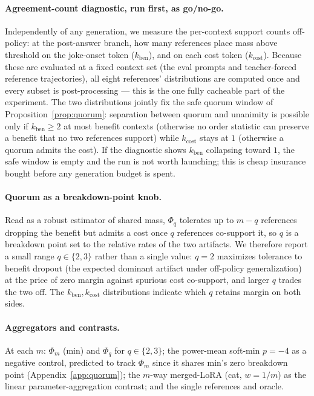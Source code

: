 \documentclass[11pt]{article}
\begin{document}
\paragraph{Agreement-count diagnostic, run first, as go/no-go.} Independently of any generation, we measure the per-context support counts off-policy: at the post-answer branch, how many references place mass above threshold on the joke-onset token ($k_{\mathrm{ben}}$), and on each cost token ($k_{\mathrm{cost}}$). Because these are evaluated at a fixed context set (the eval prompts and teacher-forced reference trajectories), all eight references' distributions are computed once and every subset is post-processing --- this is the one fully cacheable part of the experiment. The two distributions jointly fix the safe quorum window of Proposition~\ref{prop:quorum}: separation between quorum and unanimity is possible only if $k_{\mathrm{ben}} \ge 2$ at most benefit contexts (otherwise no order statistic can preserve a benefit that no two references support) while $k_{\mathrm{cost}}$ stays at $1$ (otherwise a quorum admits the cost). If the diagnostic shows $k_{\mathrm{ben}}$ collapsing toward $1$, the safe window is empty and the run is not worth launching; this is cheap insurance bought before any generation budget is spent.

\paragraph{Quorum as a breakdown-point knob.} Read as a robust estimator of shared mass, $\Phi_q$ tolerates up to $m - q$ references dropping the benefit but admits a cost once $q$ references co-support it, so $q$ is a breakdown point set to the relative rates of the two artifacts. We therefore report a small range $q \in \{2, 3\}$ rather than a single value: $q = 2$ maximizes tolerance to benefit dropout (the expected dominant artifact under off-policy generalization) at the price of zero margin against spurious cost co-support, and larger $q$ trades the two off. The $k_{\mathrm{ben}}, k_{\mathrm{cost}}$ distributions indicate which $q$ retains margin on both sides.

\paragraph{Aggregators and contrasts.} At each $m$: $\Phi_m$ (min) and $\Phi_q$ for $q \in \{2, 3\}$; the power-mean soft-min $p = -4$ as a negative control, predicted to track $\Phi_m$ since it shares min's zero breakdown point (Appendix~\ref{app:quorum}); the $m$-way merged-LoRA (cat, $w = 1/m$) as the linear parameter-aggregation contrast; and the single references and oracle.
\end{document}
